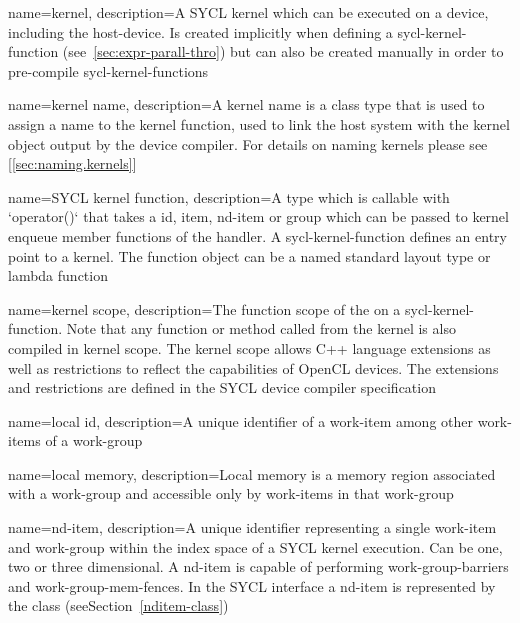 {
  name=kernel,
  description={A SYCL kernel which can be executed on a \gls{device},
  including the \gls{host-device}. Is created implicitly when defining a
  \gls{sycl-kernel-function} (see~\ref{sec:expr-parall-thro}) but can also be
  created manually in order to pre-compile \glspl{sycl-kernel-function}}
}

{
  name={kernel name},
  description={A kernel name is a class type that is used to assign a name to
               the kernel function, used to link the host system with the
               kernel object output by the device compiler. For details on naming
               kernels please see [\ref{sec:naming.kernels}]}
}

{
  name={SYCL kernel function},
  description={A type which is callable with `operator()` that takes a \gls{id},
  \gls{item}, \gls{nd-item} or \gls{group} which can be passed to kernel
  enqueue member functions of the \gls{handler}. A \gls{sycl-kernel-function}
  defines an entry point to a \gls{kernel}. The function object can be a named
  standard layout type or lambda function}
}

{
  name={kernel scope},
  description={The function scope of the  on a \gls{sycl-kernel-function}. Note
               that any function or method called from the kernel is also
               compiled in kernel scope. The kernel scope allows C++ language
               extensions as well as restrictions to reflect the capabilities of
               OpenCL devices. The extensions and restrictions are defined in
               the SYCL device compiler specification}
}

{
  name={local id},
  description={A unique identifier of a work-item among other work-items of a
               work-group}
}

{
  name={local memory},
  description={Local memory is a memory region associated with a work-group
               and accessible only by work-items in that work-group}
}

{
  name={nd-item},
  description={A unique identifier representing a single \gls{work-item} and
  \gls{work-group} within the index space of a SYCL kernel execution. Can be
  one, two or three dimensional. A \gls{nd-item} is capable of performing
  \glspl{work-group-barrier} and \glspl{work-group-mem-fence}. In the SYCL
  interface a \gls{nd-item} is represented by the  class
  (seeSection~\ref{nditem-class})}
}

